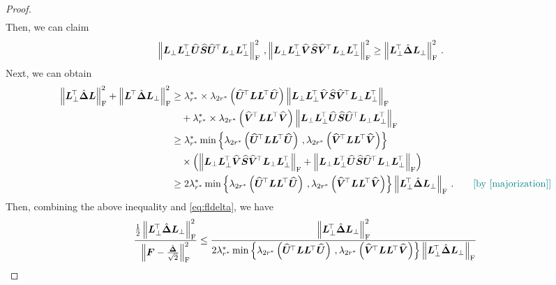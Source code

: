 \begin{proof}
\begin{align*}
\end{align*}
Then, we can claim
\begin{align}\label{majorization}
    \left\|\bm L_\perp \bm L_\perp^{\!\top} \widehat{\bm U}\widehat{\bm S}\widehat{\bm U}^{\!\top}\bm L_\perp \bm L_\perp^{\!\top}\right\|^2_{\rm F}\,,\left\|\bm L_\perp \bm L_\perp^{\!\top} \widehat{\bm V}\widehat{\bm S}\widehat{\bm V}^{\!\top}\bm L_\perp \bm L_\perp^{\!\top}\right\|^2_{\rm F} & \geq \left\|\bm L_\perp^{\!\top}\hat{\bm \Delta}\bm L_\perp\right\|^2_{\rm F}\,.
\end{align}
Next, we can obtain
\begin{align*}
    \left\|\bm L_\perp^{\!\top}\hat{\bm \Delta}\bm L\right\|^2_{\rm F} + \left\|\bm L^{\!\top}\hat{\bm \Delta}\bm L_\perp\right\|^2_{\rm F} & \geq \lambda^*_{r^*}\times\lambda_{2r^*}\left(\widehat{\bm U}^{\!\top}\bm L \bm L^{\!\top} \widehat{\bm U}\right)\left\|\bm L_\perp \bm L_\perp^{\!\top} \widehat{\bm V}\widehat{\bm S}\widehat{\bm V}^{\!\top}\bm L_\perp \bm L_\perp^{\!\top}\right\|_{\rm F}\\
    &\quad + \lambda^*_{r^*}\times\lambda_{2r^*}\left(\widehat{\bm V}^{\!\top}\bm L \bm L^{\!\top} \widehat{\bm V}\right)\left\|\bm L_\perp \bm L_\perp^{\!\top} \widehat{\bm U}\widehat{\bm S}\widehat{\bm U}^{\!\top}\bm L_\perp \bm L_\perp^{\!\top}\right\|_{\rm F}\\
    & \geq \lambda^*_{r^*} \min\left\{\lambda_{2r^*}\left(\widehat{\bm U}^{\!\top}\bm L \bm L^{\!\top} \widehat{\bm U}\right)\,,\lambda_{2r^*}\left(\widehat{\bm V}^{\!\top}\bm L \bm L^{\!\top} \widehat{\bm V}\right)\right\}\\
    & \quad \times \left(\left\|\bm L_\perp \bm L_\perp^{\!\top} \widehat{\bm V}\widehat{\bm S}\widehat{\bm V}^{\!\top}\bm L_\perp \bm L_\perp^{\!\top}\right\|_{\rm F}+\left\|\bm L_\perp \bm L_\perp^{\!\top} \widehat{\bm U}\widehat{\bm S}\widehat{\bm U}^{\!\top}\bm L_\perp \bm L_\perp^{\!\top}\right\|_{\rm F}\right)\\
    & \geq 2\lambda^*_{r^*} \min\left\{\lambda_{2r^*}\left(\widehat{\bm U}^{\!\top}\bm L \bm L^{\!\top} \widehat{\bm U}\right)\,,\lambda_{2r^*}\left(\widehat{\bm V}^{\!\top}\bm L \bm L^{\!\top} \widehat{\bm V}\right)\right\}\left\|\bm L_\perp^{\!\top}\hat{\bm \Delta}\bm L_\perp\right\|_{\rm F}\,.\tag*{\color{teal}[by \cref{majorization}]}
\end{align*}
Then, combining the above inequality and \cref{eq:fldelta}, we have
\begin{align*}
    \frac{\frac{1}{2}\left\|\bm L_\perp^{\!\top}\hat{\bm \Delta}\bm L_\perp\right\|^2_{\rm F}}{\left\|\bm F - \frac{\hat{\bm \Delta}}{\sqrt{2}}\right\|^2_{\rm F}} & \leq \frac{\left\|\bm L_\perp^{\!\top}\hat{\bm \Delta}\bm L_\perp\right\|^2_{\rm F}}{2\lambda^*_{r^*} \min\left\{\lambda_{2r^*}\left(\widehat{\bm U}^{\!\top}\bm L \bm L^{\!\top} \widehat{\bm U}\right)\,,\lambda_{2r^*}\left(\widehat{\bm V}^{\!\top}\bm L \bm L^{\!\top} \widehat{\bm V}\right)\right\}\left\|\bm L_\perp^{\!\top}\hat{\bm \Delta}\bm L_\perp\right\|_{\rm F}}\\

\end{align*}
\end{proof}
